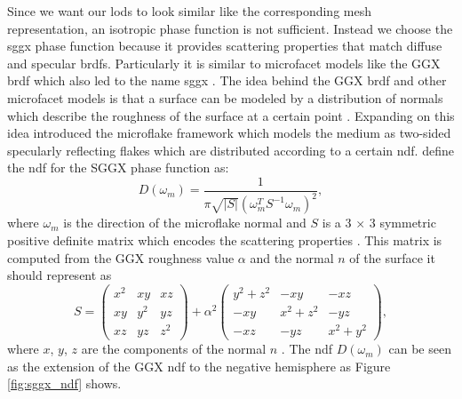 Since we want our \acp{lod} to look similar like the corresponding mesh representation, an isotropic phase function is not sufficient.
Instead we choose the \acs{sggx} phase function \cite{sggx} because it provides scattering properties that match diffuse and specular \acsp{brdf}.
Particularly it is similar to microfacet models like the GGX \acs{brdf} \cite{ggx} which also led to the name \acf{sggx} \cite{sggx}.
The idea behind the GGX \ac{brdf} and other microfacet models is that a surface can be modeled by a distribution of normals which describe the roughness of the surface at a certain point \cite{ggx}.
Expanding on this idea \citeauthor{microflake} \cite{microflake} introduced the microflake framework which models the medium as two-sided specularly reflecting flakes which are distributed according to a certain \ac{ndf}.
\citeauthor{sggx} \cite{sggx} define the \ac{ndf} for the SGGX phase function as:
\begin{equation*}
    D(\omega_m)=\frac{1}{\pi \sqrt{|S|}(\omega_m^T S^{-1} \omega_m)^2},
\end{equation*}
where $\omega_m$ is the direction of the microflake normal and $S$ is a 3 $\times$ 3 symmetric positive definite matrix which encodes the scattering properties \cite{sggx}.
This matrix is computed from the GGX roughness value $\alpha$ and the normal $n$ of the surface it should represent as
\begin{equation*}
    S=\begin{pmatrix}x^2 & xy & xz \\ xy & y^2 & yz \\ xz & yz & z^2\end{pmatrix} + \alpha^2\begin{pmatrix}y^2 + z^2 & -xy & -xz \\ -xy & x^2+z^2 & -yz \\ -xz & -yz & x^2+y^2\end{pmatrix},
\end{equation*}
where $x$, $y$, $z$ are the components of the normal $n$ \cite{sggx}.
The \ac{ndf} $D(\omega_m)$ can be seen as the extension of the GGX \acs{ndf} to the negative hemisphere as Figure \ref{fig:sggx_ndf} shows.
